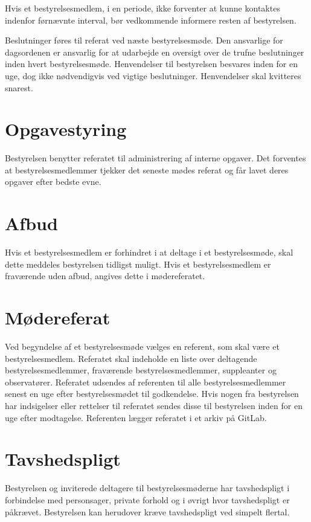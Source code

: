 Hvis et bestyrelsesmedlem, i en periode, ikke forventer at kunne kontaktes indenfor førnævnte interval, bør vedkommende informere resten af bestyrelsen.

Beslutninger føres til referat ved næste bestyrelsesmøde. Den ansvarlige for dagsordenen er ansvarlig for at udarbejde en oversigt over de trufne beslutninger inden hvert bestyrelsesmøde. Henvendelser til bestyrelsen besvares inden for en uge, dog ikke nødvendigvis ved vigtige beslutninger. Henvendelser skal kvitteres snarest.

\section{Opgavestyring}
Bestyrelsen benytter referatet til administrering af interne opgaver. Det forventes at bestyrelsesmedlemmer tjekker det seneste mødes referat og får lavet deres opgaver efter bedste evne.

\section{Afbud}
Hvis et bestyrelsesmedlem er forhindret i at deltage i et bestyrelsesmøde, skal dette meddeles bestyrelsen tidligst muligt. Hvis et bestyrelsesmedlem er fraværende uden afbud, angives dette i mødereferatet.

\section{Mødereferat}
Ved begyndelse af et bestyrelsesmøde vælges en referent, som skal være et bestyrelsesmedlem. Referatet skal indeholde en liste over deltagende bestyrelsesmedlemmer, fraværende bestyrelsesmedlemmer, suppleanter og observatører. Referatet udsendes af referenten til alle bestyrelsesmedlemmer senest en uge efter bestyrelsesmødet til godkendelse. Hvis nogen fra bestyrelsen har indsigelser eller rettelser til referatet sendes disse til bestyrelsen inden for en uge efter modtagelse. Referenten lægger referatet i et arkiv på GitLab.

\section{Tavshedspligt}
Bestyrelsen og inviterede deltagere til bestyrelsesmøderne har tavshedspligt i forbindelse med personsager, private forhold og i øvrigt hvor tavshedspligt er påkrævet. Bestyrelsen kan herudover kræve tavshedspligt ved simpelt flertal.


